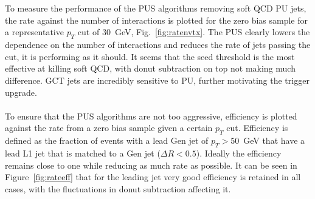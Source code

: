\\\\
\noindent To measure the performance of the PUS algorithms removing soft QCD PU jets, the rate against the number of interactions is plotted for the zero bias sample for a representative $p_T$ cut of $30$~GeV, Fig.~\ref{fig:ratenvtx}. The PUS clearly lowers the dependence on the number of interactions and reduces the rate of jets passing the cut, it is performing as it should. It seems that the seed threshold is the most effective at killing soft QCD, with donut subtraction on top not making much difference. GCT jets are incredibly sensitive to PU, further motivating the trigger upgrade.
\\\\
\noindent To ensure that the PUS algorithms are not too aggressive, efficiency is plotted against the rate from a zero bias sample given a certain $p_T$ cut. Efficiency is defined as the fraction of events with a lead Gen jet of $p_T>50$~GeV that have a lead L1 jet that is matched to a Gen jet ($\Delta R<0.5$). Ideally the efficiency remains close to one while reducing as much rate as possible. It can be seen in Figure~\ref{fig:rateeff} that for the leading jet very good efficiency is retained in all cases, with the fluctuations in donut subtraction affecting it.
